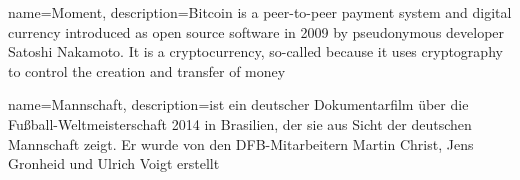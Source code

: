 \usepackage{glossaries} %


{
  name={Moment}, %
  description={Bitcoin is a peer-to-peer payment system and digital currency introduced as open source software in 2009 by pseudonymous developer Satoshi Nakamoto. It is a cryptocurrency, so-called because it uses cryptography to control the creation and transfer of money} %
}


{
  name={Mannschaft}, %
  description={ist ein deutscher Dokumentarfilm über die Fußball-Weltmeisterschaft 2014 in Brasilien, der sie aus Sicht der deutschen Mannschaft zeigt. Er wurde von den DFB-Mitarbeitern Martin Christ, Jens Gronheid und Ulrich Voigt erstellt} %
}

\makenoidxglossaries